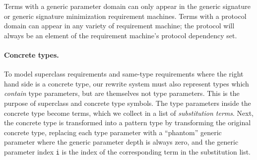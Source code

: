 \documentclass[../generics]{subfiles}
\begin{document}
%
Terms with a generic parameter domain can only appear in the generic signature or generic signature minimization requirement machines. Terms with a protocol domain can appear in any variety of requirement machine; the protocol will always be an element of the requirement machine's protocol dependency set.

\paragraph{Concrete types.}
%
%
%
%
%
%
%
To model superclass requirements and same-type requirements where the right hand side is a concrete type, our rewrite system must also represent types which \emph{contain} type parameters, but are themselves not type parameters. This is the purpose of superclass and concrete type symbols. The type parameters inside the concrete type become terms, which we collect in a list of \emph{substitution terms}. Next, the concrete type is transformed into a pattern type by transforming the original concrete type, replacing each type parameter with a ``phantom'' generic parameter  where the generic parameter depth is always zero, and the generic parameter index \texttt{i} is the index of the corresponding term in the substitution list.
\end{document}
